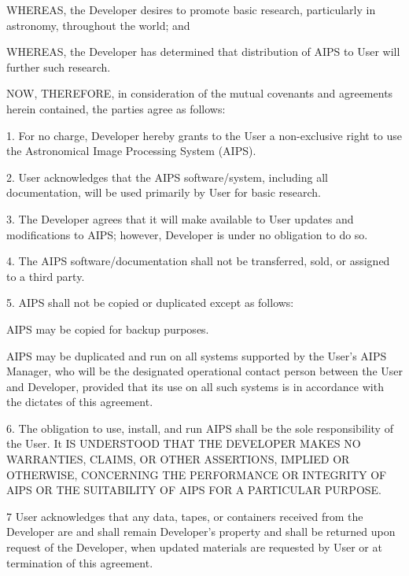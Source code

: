      WHEREAS, the Developer desires to promote basic research,
particularly in astronomy, throughout the world; and

     WHEREAS, the Developer has determined that distribution of AIPS
to User will further such research.

     NOW, THEREFORE, in consideration of the mutual covenants and
agreements herein contained, the parties agree as follows:

\item{1.} For no charge, Developer hereby grants to the User a
non-exclusive right to use the Astronomical Image Processing System
(AIPS).\parskip 8pt

\item{2.}  User acknowledges that the AIPS software/system, including
all documentation, will be used primarily by User for basic research.

\item{3.}  The Developer agrees that it will make available to User
updates and modifications to AIPS; however, Developer is under no
obligation to do so.

\item{4.}  The AIPS software/documentation shall not be transferred,
sold, or assigned to a third party.

\item{5.} AIPS shall not be copied or duplicated except as
follows:\parskip 3pt

 AIPS may be copied for backup purposes.

 AIPS may be duplicated and run on all systems supported
by the User's AIPS Manager, who will be the designated operational
contact person between the User and Developer, provided that its use
on all such systems is in accordance with the dictates of this agreement.
\parskip 8pt

\item{6.}  The obligation to use, install, and run AIPS shall be the
sole responsibility of the User.  It IS UNDERSTOOD THAT THE DEVELOPER
MAKES NO WARRANTIES, CLAIMS, OR OTHER ASSERTIONS, IMPLIED OR
OTHERWISE, CONCERNING THE PERFORMANCE OR INTEGRITY OF AIPS OR THE
SUITABILITY OF AIPS FOR A PARTICULAR PURPOSE.

\item{7}  User acknowledges that any data, tapes, or containers
received from the Developer are and shall remain Developer's property
and shall be returned upon request of the Developer, when updated
materials are requested by User or at termination of this agreement.

